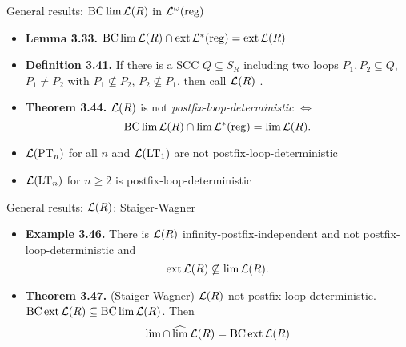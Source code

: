 \documentclass[
	handout,
	notheorems,noamsthm]{beamer}
\begin{document}
\begin{frame}[<+->]{General results: $\operatorname{BC} \lim \mathcal{L}(R)$ in $\mathcal{L}^\omega(\textup{\textrm{reg}})$}
\begin{itemize}
\item \textbf{Lemma 3.33.} $\operatorname{BC} \lim \mathcal{L}(R) \cap \operatorname{ext} \mathcal{L}^*(\textup{\textrm{reg}}) = \operatorname{ext} \mathcal{L}(R)$
\item \textbf{Definition 3.41.} If there is a SCC $Q \subseteq S_R$ including two loops $P_1,P_2 \subseteq Q$, $P_1 \neq P_2$ with $P_1 \not\subseteq P_2$, $P_2 \not\subseteq P_1$, then call $\mathcal{L}(R)$ .
\item \textbf{Theorem 3.44.} $\mathcal{L}(R)$ is not \emph{postfix-loop-deterministic} $\Leftrightarrow$
\[ \operatorname{BC} \lim \mathcal{L}(R) \cap \lim \mathcal{L}^*(\textup{\textrm{reg}}) = \lim \mathcal{L}(R) . \]
\item $\mathcal{L}(\textup{\textrm{PT}}_n)$ for all $n$ and $\mathcal{L}(\textup{\textrm{LT}}_1)$ are not postfix-loop-deterministic
\item $\mathcal{L}(\textup{\textrm{LT}}_n)$ for $n \ge 2$ is postfix-loop-deterministic
\end{itemize}
\end{frame}

\begin{frame}[<+->]{General results: $\mathcal{L}(R)$: Staiger-Wagner}
\begin{itemize}
\item \textbf{Example 3.46.} There is $\mathcal{L}(R)$ infinity-postfix-independent and not postfix-loop-deterministic and
\[ \operatorname{ext} \mathcal{L}(R) \not\subseteq \lim \mathcal{L}(R) . \]
\item \textbf{Theorem 3.47.} (Staiger-Wagner) $\mathcal{L}(R)$ not postfix-loop-deterministic. $\operatorname{BC} \operatorname{ext} \mathcal{L}(R) \subseteq \operatorname{BC} \lim \mathcal{L}(R)$. Then
\[ \lim \cap \operatorname{\widehat{lim}} \mathcal{L}(R) = \operatorname{BC} \operatorname{ext} \mathcal{L}(R) \]
\end{itemize}
\end{frame}
\end{document}
